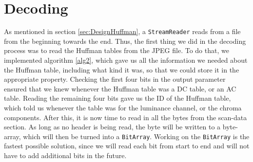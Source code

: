 \section{Decoding}
As mentioned in section \ref{sec:DesignHuffman}, a \lstinline|StreamReader| reads from a file from the beginning towards the end.
Thus, the first thing we did in the decoding process was to read the Huffman tables from the JPEG file. 
To do that, we implemented algorithm \ref{alg2}, which gave us all the information we needed about the Huffman table, including what kind it was, so that we could store it in the appropriate property. 
Checking the first four bits in the output parameter ensured that we knew whenever the Huffman table was a DC table, or an AC table. 
Reading the remaining four bits gave us the ID of the Huffman table, which told us whenever the table was for the luminance channel, or the chroma components.
After this, it is now time to read in all the bytes from the scan-data section. As long as no header is being read, the byte will be written to a byte-array, which will then be turned into a \lstinline|BitArray|.
Working on the \lstinline|BitArray| is the fastest possible solution, since we will read each bit from start to end and will not have to add additional bits in the future.
